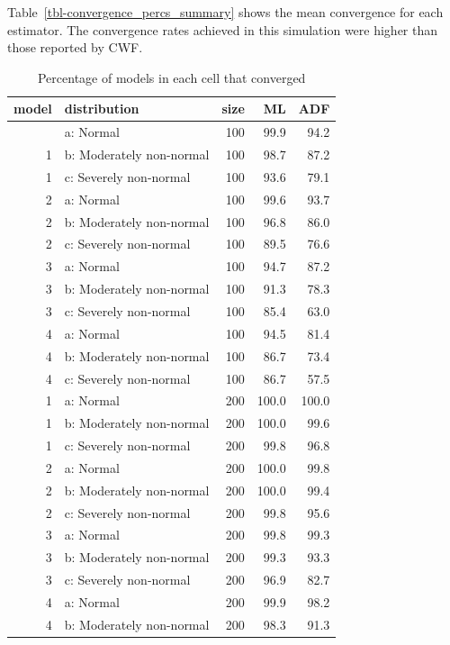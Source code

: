 \documentclass[
  letterpaper,
  DIV=11,
  numbers=noendperiod]{scrartcl}
\begin{document}
Table~\ref{tbl-convergence_percs_summary} shows the mean convergence for
each estimator. The convergence rates achieved in this simulation were
higher than those reported by CWF.

\begin{longtable}[]{@{}rlrrr@{}}

\caption{\label{tbl-convergence_percs}Percentage of models in each cell
that converged}

\tabularnewline

\toprule\noalign{}
model & distribution & size & ML & ADF \\
\midrule\noalign{}
\endhead
\bottomrule\noalign{}
\endlastfoot
1 & a: Normal & 100 & 99.9 & 94.2 \\
1 & b: Moderately non-normal & 100 & 98.7 & 87.2 \\
1 & c: Severely non-normal & 100 & 93.6 & 79.1 \\
2 & a: Normal & 100 & 99.6 & 93.7 \\
2 & b: Moderately non-normal & 100 & 96.8 & 86.0 \\
2 & c: Severely non-normal & 100 & 89.5 & 76.6 \\
3 & a: Normal & 100 & 94.7 & 87.2 \\
3 & b: Moderately non-normal & 100 & 91.3 & 78.3 \\
3 & c: Severely non-normal & 100 & 85.4 & 63.0 \\
4 & a: Normal & 100 & 94.5 & 81.4 \\
4 & b: Moderately non-normal & 100 & 86.7 & 73.4 \\
4 & c: Severely non-normal & 100 & 86.7 & 57.5 \\
1 & a: Normal & 200 & 100.0 & 100.0 \\
1 & b: Moderately non-normal & 200 & 100.0 & 99.6 \\
1 & c: Severely non-normal & 200 & 99.8 & 96.8 \\
2 & a: Normal & 200 & 100.0 & 99.8 \\
2 & b: Moderately non-normal & 200 & 100.0 & 99.4 \\
2 & c: Severely non-normal & 200 & 99.8 & 95.6 \\
3 & a: Normal & 200 & 99.8 & 99.3 \\
3 & b: Moderately non-normal & 200 & 99.3 & 93.3 \\
3 & c: Severely non-normal & 200 & 96.9 & 82.7 \\
4 & a: Normal & 200 & 99.9 & 98.2 \\
4 & b: Moderately non-normal & 200 & 98.3 & 91.3 \\

\end{longtable}
\end{document}

